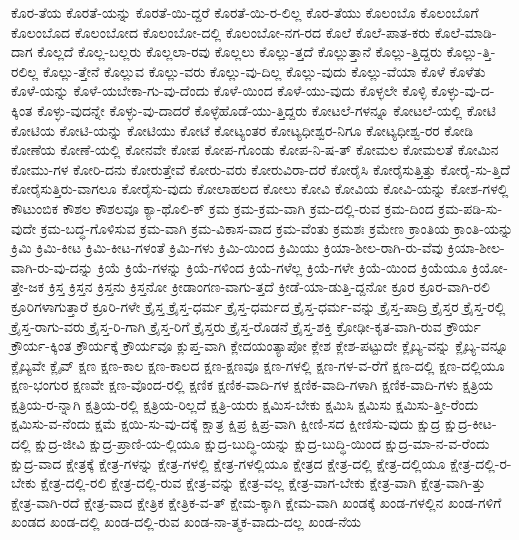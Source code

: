 {ಕೊರ-ತೆಯ
ಕೊರತೆ-ಯನ್ನು
ಕೊರತೆ-ಯಿ-ದ್ದರೆ
ಕೊರತೆ-ಯಿ-ರ-ಲಿಲ್ಲ
ಕೊರ-ತೆಯು
ಕೊಲಂಬೊ
ಕೊಲಂಬೊಗೆ
ಕೊಲಂಬೊದ
ಕೊಲಂಬೋದ
ಕೊಲಂಬೋ-ದಲ್ಲಿ
ಕೊಲಂಬೋ-ನಗ-ರದ
ಕೊಲೆ
ಕೊಲೆ-ಪಾತ-ಕರು
ಕೊಲೆ-ಮಾಡಿ-ದಾಗ
ಕೊಲ್ಲದೆ
ಕೊಲ್ಲ-ಬಲ್ಲರು
ಕೊಲ್ಲಲಾ-ರವು
ಕೊಲ್ಲಲು
ಕೊಲ್ಲು-ತ್ತದೆ
ಕೊಲ್ಲುತ್ತಾನೆ
ಕೊಲ್ಲು-ತ್ತಿದ್ದರು
ಕೊಲ್ಲು-ತ್ತಿ-ರಲಿಲ್ಲ
ಕೊಲ್ಲು-ತ್ತೇನೆ
ಕೊಲ್ಲುವ
ಕೊಲ್ಲು-ವರು
ಕೊಲ್ಲು-ವು-ದಿಲ್ಲ
ಕೊಲ್ಲು-ವುದು
ಕೊಲ್ಲು-ವೆಯಾ
ಕೊಳೆ
ಕೊಳೆತು
ಕೊಳೆ-ಯನ್ನು
ಕೊಳೆ-ಯಬೇಕಾ-ಗು-ವು-ದೆಂದು
ಕೊಳೆ-ಯಿಂದ
ಕೊಳೆ-ಯು-ವುದು
ಕೊಳ್ಳಲೇ
ಕೊಳ್ಳಿ
ಕೊಳ್ಳು-ವು-ದ-ಕ್ಕಿಂತ
ಕೊಳ್ಳು-ವುದನ್ನೇ
ಕೊಳ್ಳು-ವು-ದಾದರೆ
ಕೊಳ್ಳೆಹೊಡೆ-ಯು-ತ್ತಿದ್ದರು
ಕೋಟಲೆ-ಗಳನ್ನೂ
ಕೋಟಲೆ-ಯಲ್ಲಿ
ಕೋಟಿ
ಕೋಟಿಯ
ಕೋಟಿ-ಯನ್ನು
ಕೋಟಿಯು
ಕೋಟೆ
ಕೋಟ್ಯಂತರ
ಕೋಟ್ಯಧೀಶ್ವರ-ನಿಗೂ
ಕೋಟ್ಯಧೀಶ್ವ-ರರ
ಕೋಡಿ
ಕೋಣೆಯ
ಕೋಣೆ-ಯಲ್ಲಿ
ಕೋನವೇ
ಕೋಪ
ಕೋಪ-ಗೊಂಡು
ಕೋಪ-ನಿ-ಷ-ತ್
ಕೋಮಲ
ಕೋಮಲತೆ
ಕೋಮಿನ
ಕೋಮು-ಗಳ
ಕೋರಿ-ದನು
ಕೋರುತ್ತೇವೆ
ಕೋರು-ವರು
ಕೋರುವಿರಾ-ದರೆ
ಕೋರೈಸಿ
ಕೋರೈಸುತ್ತಿತ್ತು
ಕೋರೈ-ಸು-ತ್ತಿದೆ
ಕೋರೈಸುತ್ತಿರು-ವಾಗಲೂ
ಕೋರೈಸು-ವುದು
ಕೋಲಾಹಲದ
ಕೋಲು
ಕೋವಿ
ಕೋವಿಯ
ಕೋವಿ-ಯನ್ನು
ಕೋಶ-ಗಳಲ್ಲಿ
ಕೌಟುಂಬಿಕ
ಕೌಶಲ
ಕೌಶಲವೂ
ಕ್ಯಾ-ಥೊಲಿ-ಕ್
ಕ್ರಮ
ಕ್ರಮ-ಕ್ರಮ-ವಾಗಿ
ಕ್ರಮ-ದಲ್ಲಿ-ರುವ
ಕ್ರಮ-ದಿಂದ
ಕ್ರಮ-ಪಡಿ-ಸು-ವುದೇ
ಕ್ರಮ-ಬದ್ಧ-ಗೊಳಿಸುವ
ಕ್ರಮ-ವಾಗಿ
ಕ್ರಮ-ವಿಕಾಸ-ವಾದ
ಕ್ರಮ-ವೆಂತು
ಕ್ರಮಶಃ
ಕ್ರಮೇಣ
ಕ್ರಾಂತಿಯ
ಕ್ರಾಂತಿ-ಯನ್ನು
ಕ್ರಿಮಿ
ಕ್ರಿಮಿ-ಕೀಟ
ಕ್ರಿಮಿ-ಕೀಟ-ಗಳಂತೆ
ಕ್ರಿಮಿ-ಗಳು
ಕ್ರಿಮಿ-ಯಿಂದ
ಕ್ರಿಮಿಯು
ಕ್ರಿಯಾ-ಶೀಲ-ರಾಗಿ-ರು-ವೆವು
ಕ್ರಿಯಾ-ಶೀಲ-ವಾಗಿ-ರು-ವು-ದನ್ನು
ಕ್ರಿಯೆ
ಕ್ರಿಯೆ-ಗಳನ್ನು
ಕ್ರಿಯೆ-ಗಳಿಂದ
ಕ್ರಿಯೆ-ಗಳೆಲ್ಲ
ಕ್ರಿಯೆ-ಗಳೇ
ಕ್ರಿಯೆ-ಯಿಂದ
ಕ್ರಿಯೆಯೂ
ಕ್ರಿಯೋ-ತ್ತೇ-ಜಕ
ಕ್ರಿಸ್ತ
ಕ್ರಿಸ್ತನ
ಕ್ರಿಸ್ತನು
ಕ್ರಿಸ್ತನೋ
ಕ್ರೀಡಾಂಗಣ-ವಾಗು-ತ್ತದೆ
ಕ್ರೀಡೆ-ಯಾ-ಡುತ್ತಿ-ದ್ದನೋ
ಕ್ರೂರ
ಕ್ರೂರ-ವಾಗಿ-ರಲಿ
ಕ್ರೂರಿಗಳಾಗುತ್ತಾರೆ
ಕ್ರೂರಿ-ಗಳೇ
ಕ್ರೈಸ್ತ
ಕ್ರೈಸ್ತ-ಧರ್ಮ
ಕ್ರೈಸ್ತ-ಧರ್ಮದ
ಕ್ರೈಸ್ತ-ಧರ್ಮ-ವನ್ನು
ಕ್ರೈಸ್ತ-ಪಾದ್ರಿ
ಕ್ರೈಸ್ತರ
ಕ್ರೈಸ್ತ-ರಲ್ಲಿ
ಕ್ರೈಸ್ತ-ರಾಗು-ವರು
ಕ್ರೈಸ್ತ-ರಿ-ಗಾಗಿ
ಕ್ರೈಸ್ತ-ರಿಗೆ
ಕ್ರೈಸ್ತರು
ಕ್ರೈಸ್ತ-ರೊಡನೆ
ಕ್ರೈಸ್ತ-ಶಕ್ತಿ
ಕ್ರೋಢೀ-ಕೃತ-ವಾಗಿ-ರುವ
ಕ್ರೌರ್ಯ
ಕ್ರೌರ್ಯ-ಕ್ಕಿಂತ
ಕ್ರೌರ್ಯಕ್ಕೆ
ಕ್ರೌರ್ಯವೂ
ಕ್ಲುಪ್ತ-ವಾಗಿ
ಕ್ಲೇದಯಂತ್ಯಾಪೋ
ಕ್ಲೇಶ
ಕ್ಲೇಶ-ಪಟ್ಟುದೇ
ಕ್ಲೈಬ್ಯ-ವನ್ನು
ಕ್ಲೈಬ್ಯ-ವನ್ನೂ
ಕ್ಲೈಬ್ಯವೇ
ಕ್ಲೈವ್
ಕ್ಷಣ
ಕ್ಷಣ-ಕಾಲ
ಕ್ಷಣ-ಕಾಲದ
ಕ್ಷಣ-ಕ್ಷಣವೂ
ಕ್ಷಣ-ಗಳಲ್ಲಿ
ಕ್ಷಣ-ಗಳ-ವ-ರೆಗೆ
ಕ್ಷಣ-ದಲ್ಲಿ
ಕ್ಷಣ-ದಲ್ಲಿಯೂ
ಕ್ಷಣ-ಭಂಗುರ
ಕ್ಷಣವೇ
ಕ್ಷಣ-ವೊಂದ-ರಲ್ಲಿ
ಕ್ಷಣಿಕ
ಕ್ಷಣಿಕ-ವಾದಿ-ಗಳ
ಕ್ಷಣಿಕ-ವಾದಿ-ಗಳಾಗಿ
ಕ್ಷಣಿಕ-ವಾದಿ-ಗಳು
ಕ್ಷತ್ರಿಯ
ಕ್ಷತ್ರಿಯ-ರ-ನ್ನಾಗಿ
ಕ್ಷತ್ರಿಯ-ರಲ್ಲಿ
ಕ್ಷತ್ರಿಯ-ರಿಲ್ಲದೆ
ಕ್ಷತ್ರಿ-ಯರು
ಕ್ಷಮಿಸ-ಬೇಕು
ಕ್ಷಮಿಸಿ
ಕ್ಷಮಿಸು
ಕ್ಷಮಿಸು-ತ್ತೀ-ರೆಂದು
ಕ್ಷಮಿಸು-ವ-ನೆಂದು
ಕ್ಷಮೆ
ಕ್ಷಯಿ-ಸು-ವು-ದಕ್ಕೆ
ಕ್ಷಾತ್ರ
ಕ್ಷಿಪ್ರ
ಕ್ಷಿಪ್ರ-ವಾಗಿ
ಕ್ಷೀಣಿ-ಸದ
ಕ್ಷೀಣಿಸು-ವುದು
ಕ್ಷುದ್ರ
ಕ್ಷುದ್ರ-ಕೀಟ-ದಲ್ಲಿ
ಕ್ಷುದ್ರ-ಜೀವಿ
ಕ್ಷುದ್ರ-ಪ್ರಾಣಿ-ಯ-ಲ್ಲಿಯೂ
ಕ್ಷುದ್ರ-ಬುದ್ಧಿ-ಯನ್ನು
ಕ್ಷುದ್ರ-ಬುದ್ಧಿ-ಯಿಂದ
ಕ್ಷುದ್ರ-ಮಾ-ನ-ವ-ರೆಂದು
ಕ್ಷುದ್ರ-ವಾದ
ಕ್ಷೇತ್ರಕ್ಕೆ
ಕ್ಷೇತ್ರ-ಗಳನ್ನು
ಕ್ಷೇತ್ರ-ಗಳಲ್ಲಿ
ಕ್ಷೇತ್ರ-ಗಳಲ್ಲಿಯೂ
ಕ್ಷೇತ್ರದ
ಕ್ಷೇತ್ರ-ದಲ್ಲಿ
ಕ್ಷೇತ್ರ-ದಲ್ಲಿಯೂ
ಕ್ಷೇತ್ರ-ದಲ್ಲಿ-ರ-ಬೇಕು
ಕ್ಷೇತ್ರ-ದಲ್ಲಿ-ರಲಿ
ಕ್ಷೇತ್ರ-ದಲ್ಲಿ-ರುವ
ಕ್ಷೇತ್ರ-ವನ್ನು
ಕ್ಷೇತ್ರ-ವಲ್ಲ
ಕ್ಷೇತ್ರ-ವಾಗ-ಬೇಕು
ಕ್ಷೇತ್ರ-ವಾಗಿ
ಕ್ಷೇತ್ರ-ವಾಗಿ-ತ್ತು
ಕ್ಷೇತ್ರ-ವಾಗಿ-ರದೆ
ಕ್ಷೇತ್ರ-ವಾದ
ಕ್ಷೇತ್ರಿಕ
ಕ್ಷೇತ್ರಿಕ-ವ-ತ್
ಕ್ಷೇಮ-ಕ್ಕಾಗಿ
ಕ್ಷೇಮ-ವಾಗಿ
ಖಂಡಕ್ಕೆ
ಖಂಡ-ಗಳಲ್ಲಿನ
ಖಂಡ-ಗಳಿಗೆ
ಖಂಡದ
ಖಂಡ-ದಲ್ಲಿ
ಖಂಡ-ದಲ್ಲಿ-ರುವ
ಖಂಡ-ನಾ-ತ್ಮಕ-ವಾದು-ದಲ್ಲ
ಖಂಡ-ನೆಯ
}
